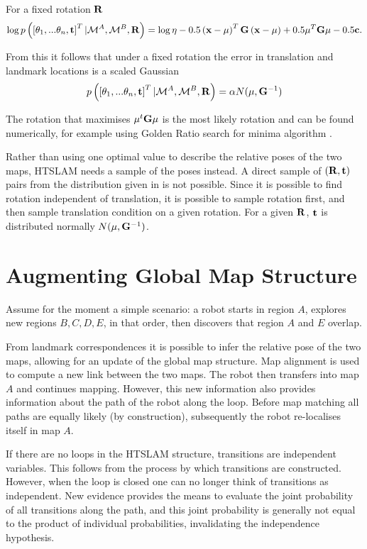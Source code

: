 For a fixed rotation ${\bf R}$ 
$$
\log p\left(\left[\theta_1, ...\theta_n,{\bf t} \right]^T | 
\mapA, \mapB,{\bf R} \right) =
\log \eta -0.5\left({\bf x - \mu}\right)^T{\bf G}\left( {\bf x - \mu} \right) +
0.5{\bf \mu}^T{\bf G\mu} -0.5 {\bf c}.
$$

From this it follows that under a fixed rotation the error in
translation and landmark locations is a scaled Gaussian
$$
p\left(\left[\theta_1, ...\theta_n,{\bf t}\right]^T | 
\mapA,\mapB,{\bf R}\right) 
= \alpha N({\bf \mu}, {\bf G}^{-1})
$$

The rotation that maximises $\mu^t{\bf G}\mu$ is the most likely
rotation and can be found numerically, for example using Golden Ratio
search for minima algorithm \cite{Pres92}.

Rather than using one optimal value to describe the relative poses of
the two maps, HTSLAM needs a sample of the poses instead. A direct
sample of $({\bf R,t})$ pairs from the distribution given in
 is not possible. Since it is possible to find
rotation independent of translation, it is possible to sample rotation
first, and then sample translation condition on a given rotation. For a
given ${\bf R}$, ${\bf t}$ is distributed normally $N(\mu, {\bf
G}^{-1})$.


\section{Augmenting Global Map Structure}
\label{sec:global_map_update}

Assume for the moment a simple scenario: a robot starts in
region $A$, explores new regions $B,C,D,E$, in that order, then
discovers that region $A$ and $E$ overlap.

From landmark correspondences it is possible to infer the relative
pose of the two maps, allowing for an update of the global map
structure. Map alignment is used to compute a new link between the
two maps. The robot then transfers into map $A$ and continues
mapping.  However, this new information also provides information
about the path of the robot along the loop. Before map matching all
paths are equally likely (by construction), subsequently the robot
re-localises itself in map $A$.

If there are no loops in the HTSLAM structure, transitions are
independent variables. This follows from the process by which
transitions are constructed.  However, when the loop is closed one can
no longer think of transitions as independent. New evidence provides
the means to evaluate the joint probability of all transitions along
the path, and this joint probability is generally not equal to the
product of individual probabilities, invalidating the independence
hypothesis.

